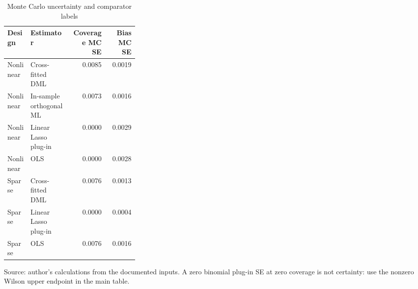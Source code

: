 \begin{table}[htbp]
\centering
\footnotesize
\caption{Monte Carlo uncertainty and comparator labels}
\begin{tabularx}{\linewidth}{Xp{0.31\linewidth}rr}
\toprule
Design & Estimator & Coverage MC SE & Bias MC SE \\
\midrule
Nonlinear & Cross-fitted DML & 0.0085 & 0.0019 \\
Nonlinear & In-sample orthogonal ML & 0.0073 & 0.0016 \\
Nonlinear & Linear Lasso plug-in & 0.0000 & 0.0029 \\
Nonlinear & OLS & 0.0000 & 0.0028 \\
Sparse & Cross-fitted DML & 0.0076 & 0.0013 \\
Sparse & Linear Lasso plug-in & 0.0000 & 0.0004 \\
Sparse & OLS & 0.0076 & 0.0016 \\
\bottomrule
\end{tabularx}
\par\vspace{3pt}\begin{minipage}{\linewidth}\footnotesize Source: author's calculations from the documented inputs.\allowbreak{} A zero binomial plug-in SE at zero coverage is not certainty: use the nonzero Wilson upper endpoint in the main table.\allowbreak{}\end{minipage}
\end{table}
